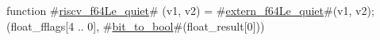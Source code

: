 function #\hyperref[sailRISCVzriscvzyf64Lezyquiet]{riscv\_f64Le\_quiet}# (v1, v2) = {
  #\hyperref[sailRISCVzexternzyf64Lezyquiet]{extern\_f64Le\_quiet}#(v1, v2);
  (float_fflags[4 .. 0], #\hyperref[sailRISCVzbitzytozybool]{bit\_to\_bool}#(float_result[0]))
}
